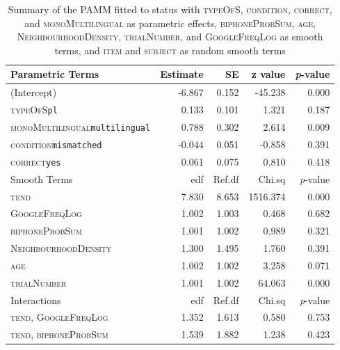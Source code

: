 \begin{table}\fontsize{10}{11}
\caption{Summary of the PAMM fitted to status with \textsc{typeOfS}, \textsc{condition}, \textsc{correct}, and \textsc{monoMultilingual} as parametric effects, \textsc{biphoneProbSum}, \textsc{age}, \textsc{NeighbourhoodDensity}, \textsc{trialNumber}, and \textsc{GoogleFreqLog} as smooth terms, and \textsc{item} and \textsc{subject} as random smooth terms}
\label{tab:7.7}
\centering
\begin{tabular}{lrrrr} 
\lsptoprule
Parametric Terms             & Estimate & SE     & z value  & \textit{p}-value  \\ 
\midrule
(Intercept)                  & -6.867   & 0.152  & -45.238  & 0.000             \\
\textsc{typeOfS}\texttt{pl}                    & 0.133    & 0.101  & 1.321    & 0.187             \\
\textsc{monoMultilingual}\texttt{multilingual} & 0.788    & 0.302  & 2.614    & 0.009             \\
\textsc{condition}\texttt{mismatched}          & -0.044   & 0.051  & -0.858   & 0.391             \\
\textsc{correct}\texttt{yes}                   & 0.061    & 0.075  & 0.810    & 0.418             \\ 
\midrule
Smooth Terms                 & edf      & Ref.df & Chi.sq   & \textit{p}-value  \\ 
\midrule
\textsc{tend}                         & 7.830    & 8.653  & 1516.374 & 0.000             \\
\textsc{GoogleFreqLog}                & 1.002    & 1.003  & 0.468    & 0.682             \\
\textsc{biphoneProbSum}               & 1.001    & 1.002  & 0.989    & 0.321             \\
\textsc{NeighbourhoodDensity}         & 1.300    & 1.495  & 1.760    & 0.391             \\
\textsc{age}                          & 1.002    & 1.002  & 3.258    & 0.071             \\
\textsc{trialNumber}                  & 1.001    & 1.002  & 64.063   & 0.000             \\ 
\midrule
Interactions                 & edf      & Ref.df & Chi.sq   & \textit{p}-value  \\ 
\midrule
\textsc{tend,
  GoogleFreqLog}        & 1.352    & 1.613  & 0.580    & 0.753             \\
\textsc{tend,
  biphoneProbSum}       & 1.539    & 1.882  & 1.238    & 0.423             \\

\end{tabular}
\end{table}
